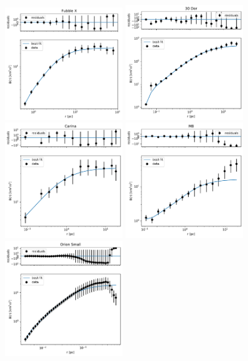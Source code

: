 \documentclass[fleqn,usenatbib, useAMS, a4paper]{mnras}
\begin{document}
\begin{figure}
\begin{multicols}{3}
 \includegraphics[width=2in]{Figures/SFplots/Hubble X.pdf}\par
 \includegraphics[width=2in]{Figures/SFplots/tarantula.pdf}\par
 \end{multicols}
 \begin{multicols}{3}
 \includegraphics[width=2in]{Figures/SFplots/Carina.pdf}\par
 \includegraphics[width=2in]{Figures/SFplots/M8.pdf}\par
 \includegraphics[width=2in]{Figures/SFplots/OS.pdf}\par

\end{multicols}
\end{figure}
\end{document}
